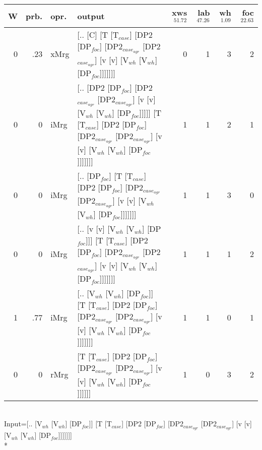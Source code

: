 \begin{tabularx}{\linewidth}{rrlXrrrr}
\hline
   W &   prb. & opr.   & output                                                                                                                                                                    &   xws$^{51.72}$ &   lab$^{47.26}$ &   wh$^{1.09}$ &   foc$^{22.63}$ \\
\hline
   0 &   .23 & xMrg & [.. [C] [T [T$_{case}$] [DP2 [DP$_{foc}$] [DP2$_{case_{agr}}$ [DP2$_{case_{agr}}$] [v [v] [V$_{wh}$ [V$_{wh}$] [DP$_{foc}$]]]]]]]                                                                         &             0 &             1 &            3 &             2 \\
   0 &   0 & iMrg & [.. [DP2 [DP$_{foc}$] [DP2$_{case_{agr}}$ [DP2$_{case_{agr}}$] [v [v] [V$_{wh}$ [V$_{wh}$] [DP$_{foc}$]]]]] [T [T$_{case}$] [DP2 [DP$_{foc}$] [DP2$_{case_{agr}}$ [DP2$_{case_{agr}}$] [v [v] [V$_{wh}$ [V$_{wh}$] [DP$_{foc}$]]]]]]] &             1 &             1 &            2 &             1 \\
   0 &   0 & iMrg & [.. [DP$_{foc}$] [T [T$_{case}$] [DP2 [DP$_{foc}$] [DP2$_{case_{agr}}$ [DP2$_{case_{agr}}$] [v [v] [V$_{wh}$ [V$_{wh}$] [DP$_{foc}$]]]]]]]                                                                    &             1 &             1 &            3 &             0 \\
   0 &   0 & iMrg & [.. [v [v] [V$_{wh}$ [V$_{wh}$] [DP$_{foc}$]]] [T [T$_{case}$] [DP2 [DP$_{foc}$] [DP2$_{case_{agr}}$ [DP2$_{case_{agr}}$] [v [v] [V$_{wh}$ [V$_{wh}$] [DP$_{foc}$]]]]]]]                                              &             1 &             1 &            1 &             2 \\
   1 &   .77 & iMrg & [.. [V$_{wh}$ [V$_{wh}$] [DP$_{foc}$]] [T [T$_{case}$] [DP2 [DP$_{foc}$] [DP2$_{case_{agr}}$ [DP2$_{case_{agr}}$] [v [v] [V$_{wh}$ [V$_{wh}$] [DP$_{foc}$]]]]]]]                                                      &             1 &             1 &            0 &             1 \\
   0 &   0 & rMrg & [T [T$_{case}$] [DP2 [DP$_{foc}$] [DP2$_{case_{agr}}$ [DP2$_{case_{agr}}$] [v [v] [V$_{wh}$ [V$_{wh}$] [DP$_{foc}$]]]]]]                                                                                  &             1 &             0 &            3 &             2 \\
\hline
\end{tabularx}\endgroup\\
\begingroup\scriptsize Input=[.. [V$_{wh}$ [V$_{wh}$] [DP$_{foc}$]] [T [T$_{case}$] [DP2 [DP$_{foc}$] [DP2$_{case_{agr}}$ [DP2$_{case_{agr}}$] [v [v] [V$_{wh}$ [V$_{wh}$] [DP$_{foc}$]]]]]]]\\*

